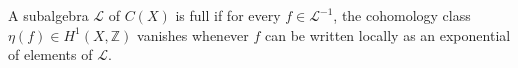 
A subalgebra $\mathcal{L}$ of $C(X)$ is full if for every $f \in \mathcal{L}^{-1}$, the cohomology class $\eta(f) \in H^1(X, \mathbb{Z})$ vanishes whenever $f$ can be written locally as an exponential of elements of $\mathcal{L}$.

